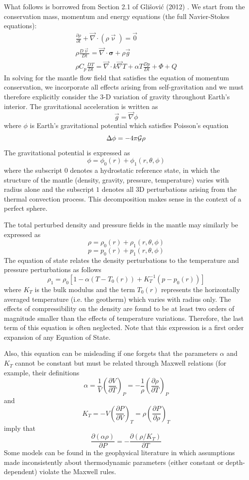What follows is borrowed from Section 2.1 of Gli{\v{s}}ovi{\'c} \etal (2012) \cite{glfm12}.
We start from the conservation mass, momentum and energy equations (the full Navier-Stokes equations):
\begin{eqnarray}
\frac{\partial \rho}{\partial t} + \vec\nabla \cdot (\rho \vec\upnu) = \vec{0} \\
\rho \frac{D\vec\upnu}{Dt} = \vec\nabla\cdot {\bm \sigma} + \rho \vec{g} \\
\rho C_p \frac{D T}{Dt} = \vec\nabla \cdot k \vec\nabla T + \alpha T \frac{Dp}{Dt} + \Phi + Q
\end{eqnarray}
In solving for the mantle flow field that satisfies the equation of momentum conservation, 
we incorporate all effects arising from
self-gravitation and we must therefore explicitly consider the 3-D variation of 
gravity throughout Earth's interior. The
gravitational acceleration is written as
\[
\vec{g} = \vec\nabla \phi
\]
where $\phi$ is Earth's gravitational potential which satisfies Poisson's equation
\[
\Delta \phi = - 4 \pi {\cal G} \rho
\]
The gravitational potential is expressed as
\[
\phi = \phi_0(r) + \phi_1(r,\theta,\phi)
\]
where the subscript $0$ denotes a hydrostatic reference state, 
in which the structure of the mantle (density, gravity, pressure, temperature) varies
with radius alone and the subscript $1$ denotes all 3D perturbations arising from the 
thermal convection process. This decomposition makes sense in the context of a perfect sphere.

The total perturbed density and pressure fields in the mantle may similarly be expressed as
\[
\rho = \rho_0(r) + \rho_1(r,\theta,\phi)
\]
\[
p = p_0(r) + p_1(r,\theta,\phi)
\]
The equation of state relates the density perturbations to the temperature and pressure perturbations 
as follows
\[
\rho_1 = \rho_0[1-\alpha(T-T_0(r))+K_T^{-1} (p-p_0(r))] 
\]
where $K_T$ is the bulk modulus and the term $T_0(r)$ represents the horizontally averaged temperature (i.e.
the geotherm) which varies with radius only. 
The effects of compressibility on the density are found to be at least two orders of magnitude
smaller than the effects of temperature variations. Therefore, the last term 
of this equation is often neglected.
Note that this expression is a first order expansion of any Equation of State. 

Also, this equation can be misleading if one forgets that the parameters $\alpha$ and $K_T$
cannot be constant but must be related through Maxwell relations (for example,
their definitions 
\[
\alpha = \frac{1}{V} \left( \frac{\partial V}{\partial T} \right)_P 
= -\frac{1}{\rho} \left( \frac{\partial \rho}{\partial T} \right)_P
\]
and 
\[
K_T 
= - V \left( \frac{\partial P}{\partial V} \right)_T
= \rho \left( \frac{\partial P}{\partial \rho} \right)_T
\]
imply that 
\[
\frac{\partial (\alpha\rho)}{\partial P}
= 
-\frac{\partial (\rho/K_T)}{\partial T}
\]
Some models can be found in the geophysical literature in which assumptions made inconsistently
about thermodynamic parameters (either constant or depth-dependent) violate the Maxwell rules.

